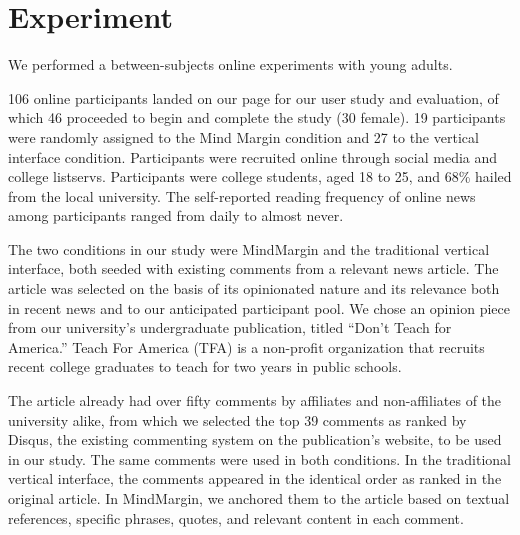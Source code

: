 \section{Experiment}

We performed a between-subjects online experiments with young adults. %

106 online participants landed on our page for our user study and evaluation, of which 46 proceeded to begin and complete the study (30 female). 19 participants were randomly assigned to the Mind Margin condition and 27 to the vertical interface condition.  Participants were recruited online through social media and college listservs. Participants were college students, aged 18 to 25, and 68\% hailed from the local university. The self-reported reading frequency of online news among participants ranged from daily to almost never. 

The two conditions in our study were MindMargin and the traditional vertical interface, both seeded with existing comments from a relevant news article. The article was selected on the basis of its opinionated nature and its relevance both in recent news and to our anticipated participant pool. We chose an opinion piece from our university's undergraduate publication, titled ``Don't Teach for America.'' Teach For America (TFA) is a non-profit organization that recruits recent college graduates to teach for two years in public schools. 

The article already had over fifty comments by affiliates and non-affiliates of the university alike, from which we selected the top 39 comments as ranked by Disqus, the existing commenting system on the publication's website, to be used in our study. The same comments were used in both conditions. In the traditional vertical interface, the comments appeared in the identical order as ranked in the original article. In MindMargin, we anchored them to the article based on textual references, specific phrases, quotes, and relevant content in each comment. 


